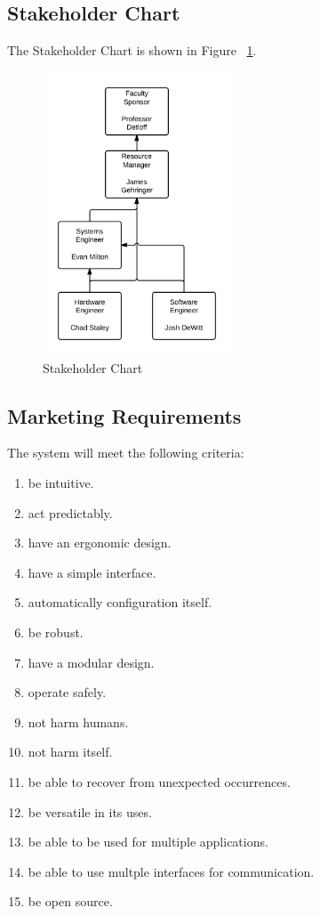 \documentclass[11pt]{report}
\begin{document}
\subsection{Stakeholder Chart}
The Stakeholder Chart is shown in Figure ~\ref{fig:organization}.
\begin{figure}[p]
	\centering
	\includegraphics[width=0.5\textwidth]{organization.png}
	\caption{Stakeholder Chart}
	\label{fig:organization}
\end{figure}

\subsection{Marketing Requirements}
The system will meet the following criteria:
\begin{enumerate} \parskip2pt
	\item be intuitive.
	\item act predictably.
	\item have an ergonomic design.
	\item have a simple interface.
	\item automatically configuration itself.
	\item be robust.
	\item have a modular design.
	\item operate safely.
	\item not harm humans.
	\item not harm itself.
	\item be able to recover from unexpected occurrences.
	\item be versatile in its uses.
	\item be able to be used for multiple applications.
	\item be able to use multple interfaces for communication.
	\item be open source.
\end{enumerate}
\end{document}
